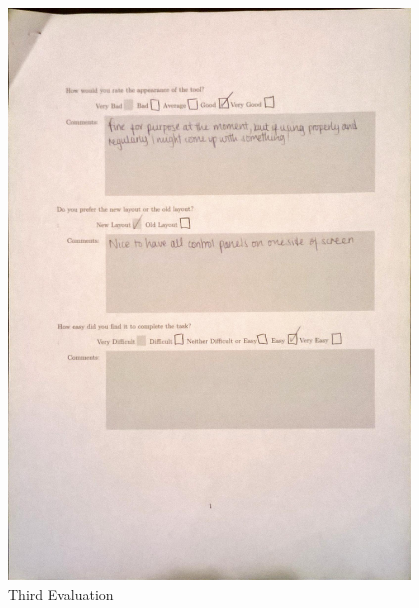 \begin{figure}[h!]
    \centering
    \includegraphics[width=0.95\textwidth]{images/user_eval/user_eval_15.jpg}
    \caption{Third Evaluation}
\end{figure}


